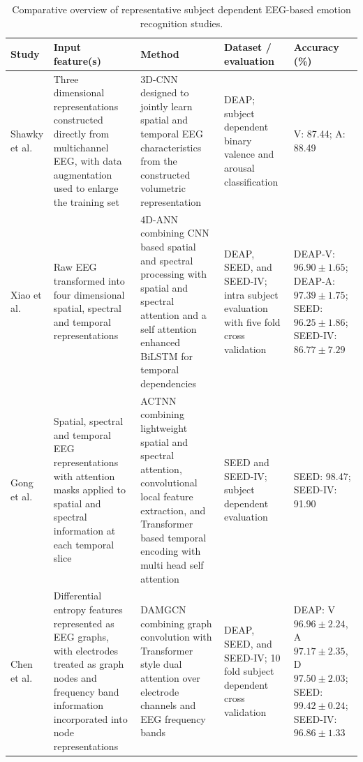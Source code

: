 \documentclass[ASNA,twocolumn]{USG}
\newcommand{\lightrowsep}{%
  \arrayrulecolor{lightrowgray}%
  \specialrule{0.30pt}{3.5pt}{3.5pt}%
  \arrayrulecolor{black}%
}
\begin{document}
\begin{table}
\addtocounter{table}{-1}
\centering
\caption{Comparative overview of representative subject dependent EEG-based emotion recognition studies.}

\scriptsize
\setlength{\tabcolsep}{3.0pt}
\renewcommand{\arraystretch}{1.18}

\begin{tabularx}{\textheight}{
>{\raggedright\arraybackslash}p{3.15cm}
>{\raggedright\arraybackslash}X
>{\raggedright\arraybackslash}X
>{\raggedright\arraybackslash}p{3.65cm}
>{\raggedright\arraybackslash}p{5.15cm}}

\toprule
\textbf{Study} &
\textbf{Input feature(s)} &
\textbf{Method} &
\textbf{Dataset / evaluation} &
\textbf{Accuracy (\%)} \\
\midrule

Shawky et al. \cite{shawky2018eeg} &
Three dimensional representations constructed directly from multichannel EEG,
with data augmentation used to enlarge the training set &
3D-CNN designed to jointly learn spatial and temporal EEG characteristics
from the constructed volumetric representation &
DEAP; subject dependent binary valence and arousal classification &
V: 87.44;
A: 88.49 \\

\lightrowsep

Xiao et al. \cite{xiao20224d} &
Raw EEG transformed into four dimensional spatial, spectral and temporal representations &
4D-ANN combining CNN based spatial and spectral processing with spatial
and spectral attention and a self attention enhanced BiLSTM
for temporal dependencies &
DEAP, SEED, and SEED-IV; intra subject evaluation with five fold cross validation &
DEAP-V: $96.90 \pm 1.65$;
DEAP-A: $97.39 \pm 1.75$;
SEED: $96.25 \pm 1.86$;
SEED-IV: $86.77 \pm 7.29$ \\

\lightrowsep

Gong et al. \cite{gong2023eeg} &
Spatial, spectral and temporal EEG representations with attention masks applied
to spatial and spectral information at each temporal slice &
ACTNN combining lightweight spatial and spectral attention,
convolutional local feature extraction,
and Transformer based temporal encoding with multi head self attention &
SEED and SEED-IV; subject dependent evaluation &
SEED: 98.47;
SEED-IV: 91.90 \\

\lightrowsep

Chen et al. \cite{chen2024eeg} &
Differential entropy features represented as EEG graphs,
with electrodes treated as graph nodes and frequency band information
incorporated into node representations &
DAMGCN combining graph convolution with Transformer style dual attention
over electrode channels and EEG frequency bands &
DEAP, SEED, and SEED-IV; 10 fold subject dependent cross validation &
DEAP: V $96.96 \pm 2.24$, A $97.17 \pm 2.35$, D $97.50 \pm 2.03$;
SEED: $99.42 \pm 0.24$;
SEED-IV: $96.86 \pm 1.33$ \\


\end{tabularx}
\end{table}
\end{document}
